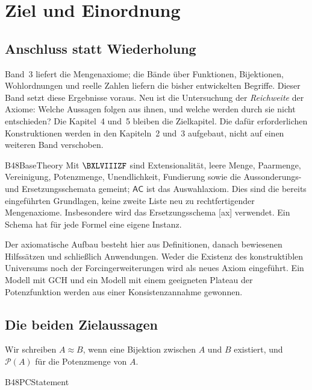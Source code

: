 \chapter{Ziel und Einordnung}

\section{Anschluss statt Wiederholung}

Band~3 liefert die Mengenaxiome; die Bände über Funktionen, Bijektionen,
Wohlordnungen und reelle Zahlen liefern die bisher entwickelten Begriffe.
Dieser Band setzt diese Ergebnisse voraus. Neu ist die Untersuchung der
\emph{Reichweite} der Axiome: Welche Aussagen folgen aus ihnen, und welche
werden durch sie nicht entschieden? Die Kapitel~4 und~5 bleiben die
Zielkapitel. Die dafür erforderlichen Konstruktionen werden in den
Kapiteln~2 und~3 aufgebaut, nicht auf einen weiteren Band verschoben.

{B48BaseTheory}{
}
\noindent
Mit \(\BXLVIIIZF\) sind Extensionalität, leere Menge, Paarmenge,
Vereinigung, Potenzmenge, Unendlichkeit, Fundierung sowie die
Aussonderungs- und Ersetzungsschemata gemeint; \(\mathsf{AC}\) ist das
Auswahlaxiom. Dies sind die bereits eingeführten Grundlagen, keine zweite
Liste neu zu rechtfertigender Mengenaxiome. Insbesondere wird das
Ersetzungsschema [ax] verwendet.
Ein Schema hat für jede Formel eine eigene Instanz.

Der axiomatische Aufbau besteht hier aus Definitionen, danach bewiesenen
Hilfssätzen und schließlich Anwendungen. Weder die Existenz des
konstruktiblen Universums noch der Forcingerweiterungen wird als neues
Axiom eingeführt. Ein Modell mit GCH und ein Modell mit einem geeigneten
Plateau der Potenzfunktion werden aus einer Konsistenzannahme gewonnen.

\section{Die beiden Zielaussagen}

Wir schreiben \(A\approx B\), wenn eine Bijektion zwischen \(A\) und \(B\)
existiert, und \(\mathcal P(A)\) für die Potenzmenge von \(A\).

{B48PCStatement}{
}

